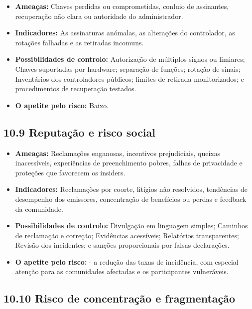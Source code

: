 \documentclass[11pt]{article}
\begin{document}
\begin{itemize}[leftmargin=*]
\item \textbf{Ameaças:} Chaves perdidas ou comprometidas, conluio de assinantes, recuperação não clara ou autoridade do administrador.
\item \textbf{Indicadores:} As assinaturas anómalas, as alterações do controlador, as rotações falhadas e as retiradas incomuns.
\item \textbf{Possibilidades de controlo:} Autorização de múltiplos signos ou limiares; Chaves suportadas por hardware; separação de funções; rotação de sinais; Inventários dos controladores públicos; limites de retirada monitorizados; e procedimentos de recuperação testados.
\item \textbf{O apetite pelo risco:} Baixo.
\end{itemize}
\subsection*{10.9 Reputação e risco social}

\begin{itemize}[leftmargin=*]
\item \textbf{Ameaças:} Reclamações enganosas, incentivos prejudiciais, queixas inacessíveis, experiências de preenchimento pobres, falhas de privacidade e proteções que favorecem os insiders.
\item \textbf{Indicadores:} Reclamações por coorte, litígios não resolvidos, tendências de desempenho dos emissores, concentração de benefícios ou perdas e feedback da comunidade.
\item \textbf{Possibilidades de controlo:} Divulgação em linguagem simples; Caminhos de reclamação e correção; Evidências acessíveis; Relatórios transparentes; Revisão dos incidentes; e sanções proporcionais por falsas declarações.
\item \textbf{O apetite pelo risco:} - a redução das taxas de incidência, com especial atenção para as comunidades afectadas e os participantes vulneráveis.
\end{itemize}
\subsection*{10.10 Risco de concentração e fragmentação}
\end{document}

